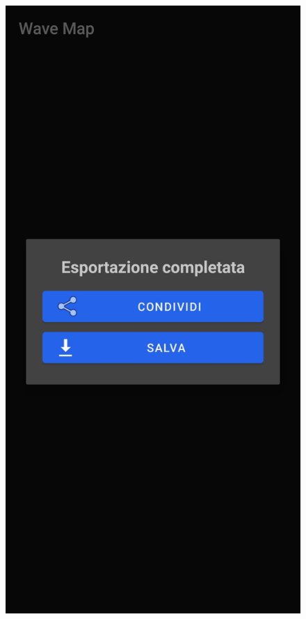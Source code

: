 \documentclass[11pt]{article}
\begin{document}
\begin{figure}[H]
\begin{minipage}[b]{0.25\textwidth}
    \end{minipage}
    \begin{minipage}[b]{0.25\textwidth}
      \includegraphics[width=\textwidth]{./img/overview/export2.jpg}

\end{minipage}
\end{figure}
\end{document}
